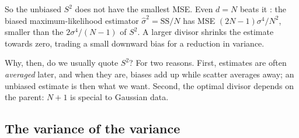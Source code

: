 So the unbiased $S^2$ does not have the smallest MSE. Even $d=N$ beats it
: the biased maximum-likelihood
estimator $\hat\sigma^2=\mathrm{SS}/N$ has MSE $(2N-1)\sigma^4/N^2$, smaller
than the $2\sigma^4/(N-1)$ of $S^2$. A larger divisor shrinks the estimate
towards zero, trading a small downward bias for a reduction in variance.

Why, then, do we usually quote $S^2$? For two reasons. First, estimates are
often \emph{averaged} later, and when they are, biases add up while scatter
averages away; an unbiased estimate is then what we want. Second, the
optimal divisor depends on the parent: $N+1$ is special to Gaussian data.

\subsection{The variance of the variance}
\label{3a:sec:var-of-var}

